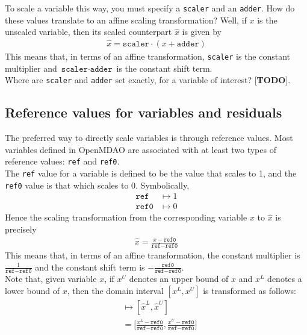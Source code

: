 \documentclass{article}
\begin{document}
To scale a variable this way, you must specify a \texttt{scaler} and an \texttt{adder}. How do these values translate to an affine scaling transformation? Well, if $x$ is the unscaled variable, then its scaled counterpart $\hat{x}$ is given by
\begin{align*}
    \hat{x} = \texttt{scaler} \cdot (x + \texttt{adder})
\end{align*}
This means that, in terms of an affine transformation, \texttt{scaler} is the constant multiplier and $\texttt{scaler} \cdot \texttt{adder}$ is the constant shift term. \\

\noindent
Where are \texttt{scaler} and \texttt{adder} set exactly, for a variable of interest? [\textbf{TODO}].

\subsection*{Reference values for variables and residuals}

The preferred way to directly scale variables is through reference values. Most variables defined in OpenMDAO are associated with at least two types of reference values: \texttt{ref} and \texttt{ref0}. \\

\noindent
The \texttt{ref} value for a variable is defined to be the value that scales to 1, and the \texttt{ref0} value is that which scales to 0. Symbolically,
\begin{align*}
    \texttt{ref} &\mapsto 1 \\
    \texttt{ref0} &\mapsto 0
\end{align*}
Hence the scaling transformation from the corresponding variable $x$ to $\hat{x}$ is precisely
\begin{align}
    \hat{x} = \frac{x - \texttt{ref0}}{\texttt{ref} - \texttt{ref0}} \label{eq:ref_scale}
\end{align}
This means that, in terms of an affine transformation, the constant multiplier is $\frac{1}{\texttt{ref} - \texttt{ref0}}$ and the constant shift term is $-\frac{\texttt{ref0}}{\texttt{ref} - \texttt{ref0}}$. \\

\noindent
Note that, given variable $x$, if $x^U$ denotes an upper bound of $x$ and $x^L$ denotes a lower bound of $x$, then the domain interval $[x^L,x^U]$ is transformed as follows:
\begin{align*}
    [x^L,x^U] &\mapsto [\hat{x}^L,\hat{x}^U] \\
    &= \Big[\frac{x^L-\texttt{ref0}}{\texttt{ref}-\texttt{ref0}},\frac{x^U-\texttt{ref0}}{\texttt{ref}-\texttt{ref0}}\Big] \\
\end{align*}
\end{document}
